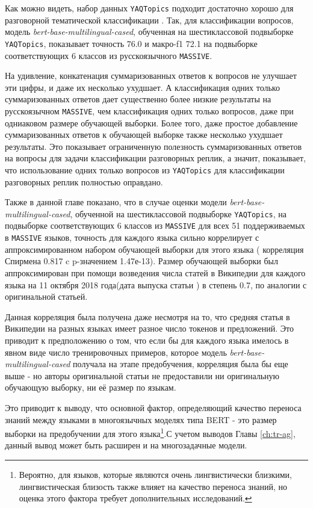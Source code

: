 Как можно видеть, набор данных \texttt{YAQTopics} подходит достаточно хорошо для разговорной тематической классификации . Так, для классификации вопросов, модель \textit{bert-base-multilingual-cased}, обученная на шестиклассовой подвыборке \texttt{YAQTopics}, показывает точность 76.0 и макро-f1 72.1 на подвыборке соответствующих 6 классов из русскоязычного \texttt{MASSIVE}. 

 На удивление, конкатенация суммаризованных ответов к вопросов не улучшает эти цифры, и даже их несколько ухудшает. А классификация одних только суммаризованных ответов дает существенно более низкие результаты на русскоязычном \texttt{MASSIVE}, чем классификация одних только вопросов, даже при одниаковом размере обучающей выборки. Более того, даже простое добавление суммаризованных ответов к обучающей выборке также несколько ухудшает результаты. Это показывает ограниченную полезность суммаризованных ответов на вопросы для задачи классификации разговорных реплик, а значит, показывает, что использование одних только вопросов  из \texttt{YAQTopics} для классификации разговорных реплик полностью оправдано. 

Также в данной главе показано, что в случае оценки модели  \textit{bert-base-multilingual-cased}, обученной на шестиклассовой подвыборке \texttt{YAQTopics}, на подвыборке соответствующих 6 классов из \texttt{MASSIVE} для всех 51 поддерживаемых в \texttt{MASSIVE} языков, точность для каждого языка сильно коррелирует с аппроксимированном набором обучающей выборки для этого языка ( корреляция Спирмена 0.817 c p-значением 1.47е-13). Размер обучающей выборки был аппроксимирован при помощи возведения числа статей в Википедии для каждого языка на 11 октября 2018 года(дата выпуска статьи \cite{bert}) в степень 0.7, по аналогии с оригинальной статьей. 

Данная корреляция была получена даже несмотря на то, что средняя статья в Википедии на разных языках имеет разное число токенов и предложений. Это приводит к предположению о том, что если бы для каждого языка имелось в явном виде число тренировочных примеров, которое модель \textit{bert-base-multilingual-cased} получала на этапе предобучения, корреляция была бы еще выше - но авторы оригинальной статьи не предоставили ни оригинальную обучающую выборку, ни её размер по языкам. 

Это приводит к выводу, что основной фактор, определяющий качество переноса знаний между языками в многоязычных моделях типа BERT - это размер выборки на предобучении для этого языка\footnote{Вероятно, для языков, которые являются очень лингвистически близкими, лингвистическая близость также влияет на качество переноса знаний, но оценка этого фактора требует дополнительных исследований.}.С учетом выводов Главы \ref{ch:tr-ag}, данный вывод может быть расширен и на многозадачные модели. 



